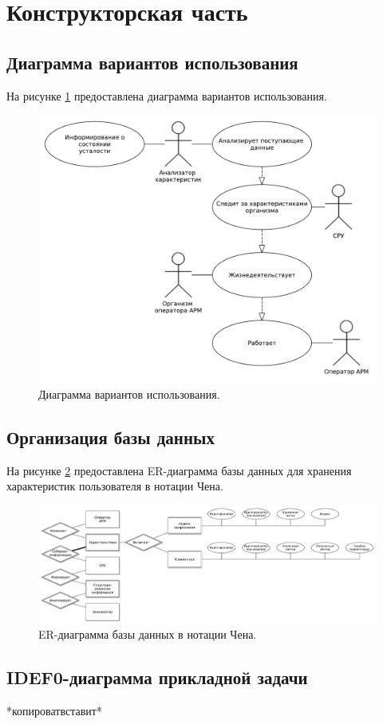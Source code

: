 \section{Конструкторская часть}
\subsection{Диаграмма вариантов использования}
На рисунке \ref{fig:useCase} предоставлена диаграмма вариантов использования.
\begin{figure}[H]
	\centering
	\includegraphics[width=\textwidth]{img/useCaseDiagramPresentation.pdf}
	\caption{Диаграмма вариантов использования.}
	\label{fig:useCase}
\end{figure}


\subsection{Организация базы данных}
На рисунке \ref{fig:chen} предоставлена ER-диаграмма базы данных для хранения характеристик пользователя в нотации Чена.
\begin{figure}[H]
	\centering
	\includegraphics[width=\textwidth]{img/chenERDiagram.pdf}
	\caption{ER-диаграмма базы данных в нотации Чена.}
	\label{fig:chen}
\end{figure}

\subsection{IDEF0-диаграмма прикладной задачи}
*копироватвставит*

\pagebreak
